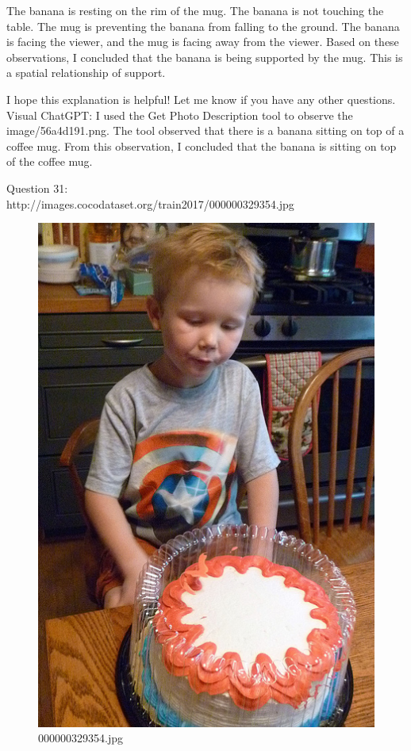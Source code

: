 \begin{enumerate}
        The banana is resting on the rim of the mug.
        The banana is not touching the table.
        The mug is preventing the banana from falling to the ground.
        The banana is facing the viewer, and the mug is facing away from the viewer.
        Based on these observations, I concluded that the banana is being supported by the mug. This is a spatial relationship of support.
        
        I hope this explanation is helpful! Let me know if you have any other questions.
        \subitem Visual ChatGPT: I used the Get Photo Description tool to observe the image/56a4d191.png. The tool observed that there is a banana sitting on top of a coffee mug. From this observation, I concluded that the banana is sitting on top of the coffee mug.
    \end{enumerate}
    Question 31:\\http://images.cocodataset.org/train2017/000000329354.jpg
    \begin{figure}[h]
        \centering
        \includegraphics[width=0.8\linewidth]{../image set/easy/000000329354.jpg}
        \caption{000000329354.jpg}
    \end{figure}
